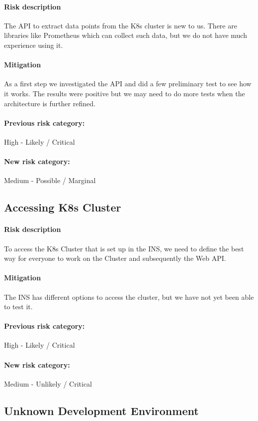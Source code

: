 \paragraph{Risk description} The API to extract data points from the K8s cluster is new to us. There are libraries like Prometheus which can collect such data, but we do not have much experience using it.
\paragraph{Mitigation} As a first step we investigated the API and did a few preliminary test to see how it works. The results were positive but we may need to do more tests when the architecture is further refined.
\paragraph{Previous risk category:} High - Likely / Critical
\paragraph{New risk category:} Medium - Possible / Marginal

\subsection{Accessing K8s Cluster}
\paragraph{Risk description} To access the K8s Cluster that is set up in the INS, we need to define the best way for everyone to work on the Cluster and subsequently the Web API.
\paragraph{Mitigation} The INS has different options to access the cluster, but we have not yet been able to test it.
\paragraph{Previous risk category:} High - Likely / Critical
\paragraph{New risk category:} Medium - Unlikely / Critical

\subsection{Unknown Development Environment}
